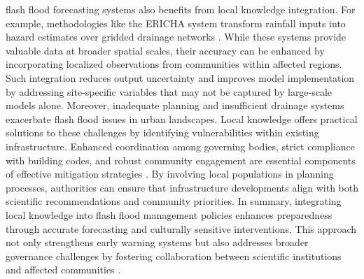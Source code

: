 flash flood forecasting systems also benefits from local knowledge integration. For example, methodologies like the ERICHA system transform rainfall inputs into hazard estimates over gridded drainage networks \citep{Ritter2021a}\citep{Ritter2021b}. While these systems provide valuable data at broader spatial scales, their accuracy can be enhanced by incorporating localized observations from communities within affected regions. Such integration reduces output uncertainty and improves model implementation by addressing site-specific variables that may not be captured by large-scale models alone. Moreover, inadequate planning and insufficient drainage systems exacerbate flash flood issues in urban landscapes. Local knowledge offers practical solutions to these challenges by identifying vulnerabilities within existing infrastructure. Enhanced coordination among governing bodies, strict compliance with building codes, and robust community engagement are essential components of effective mitigation strategies \citep{Saad2024}. By involving local populations in planning processes, authorities can ensure that infrastructure developments align with both scientific recommendations and community priorities. In summary, integrating local knowledge into flash flood management policies enhances preparedness through accurate forecasting and culturally sensitive interventions. This approach not only strengthens early warning systems but also addresses broader governance challenges by fostering collaboration between scientific institutions and affected communities \citep{Msigwa2024}\citep{Saad2024}\citep{Bodoque2019}\citep{Wang2023}.

